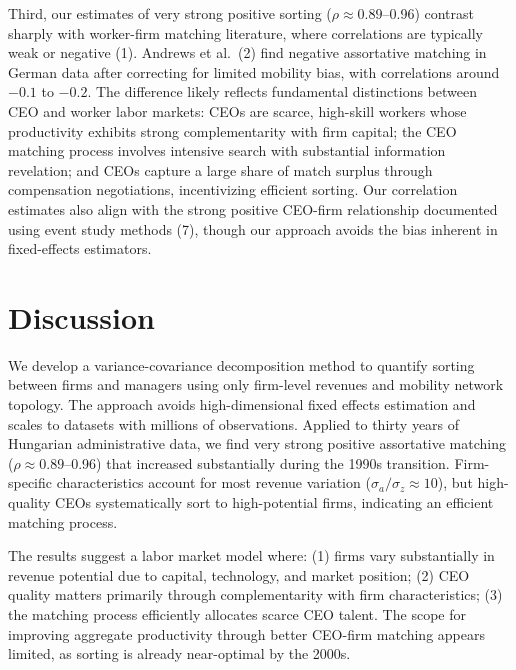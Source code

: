 \documentclass[9pt,twocolumn,twoside]{pnas-new}
\begin{document}
Third, our estimates of very strong positive sorting ($\rho \approx 0.89$--0.96) contrast sharply with worker-firm matching literature, where correlations are typically weak or negative (1). Andrews et al.\ (2) find negative assortative matching in German data after correcting for limited mobility bias, with correlations around $-0.1$ to $-0.2$. The difference likely reflects fundamental distinctions between CEO and worker labor markets: CEOs are scarce, high-skill workers whose productivity exhibits strong complementarity with firm capital; the CEO matching process involves intensive search with substantial information revelation; and CEOs capture a large share of match surplus through compensation negotiations, incentivizing efficient sorting. Our correlation estimates also align with the strong positive CEO-firm relationship documented using event study methods (7), though our approach avoids the bias inherent in fixed-effects estimators.

\section*{Discussion}

We develop a variance-covariance decomposition method to quantify sorting between firms and managers using only firm-level revenues and mobility network topology. The approach avoids high-dimensional fixed effects estimation and scales to datasets with millions of observations. Applied to thirty years of Hungarian administrative data, we find very strong positive assortative matching ($\rho \approx 0.89$--0.96) that increased substantially during the 1990s transition. Firm-specific characteristics account for most revenue variation ($\sigma_a/\sigma_z \approx 10$), but high-quality CEOs systematically sort to high-potential firms, indicating an efficient matching process.

The results suggest a labor market model where: (1) firms vary substantially in revenue potential due to capital, technology, and market position; (2) CEO quality matters primarily through complementarity with firm characteristics; (3) the matching process efficiently allocates scarce CEO talent. The scope for improving aggregate productivity through better CEO-firm matching appears limited, as sorting is already near-optimal by the 2000s.
\end{document}
